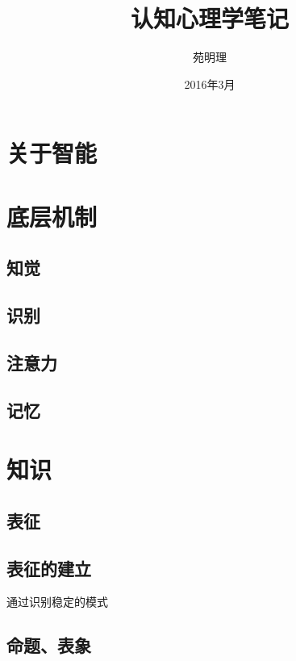 \documentclass[a4paper,12pt]{article}
\title{认知心理学笔记}
\author{苑明理}
\date{2016年3月}
\begin{document}
\maketitle{}

\renewcommand\contentsname{目录}
\setcounter{tocdepth}{2}
\tableofcontents

\newpage

\section{关于智能}

\section{底层机制}

\subsection{知觉}

\subsection{识别}

\subsection{注意力}

\subsection{记忆}

\section{知识}

\subsection{表征}

\subsection{表征的建立}

通过识别稳定的模式

\subsection{命题、表象}
\end{document}
